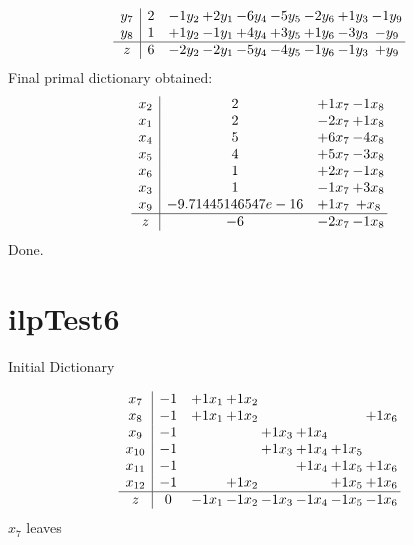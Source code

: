 \documentclass[11pt]{article}
\begin{document}
\[\begin{array}{c| c c@{\hskip 2pt} c@{\hskip 2pt} c@{\hskip 2pt} c@{\hskip 2pt} c@{\hskip 2pt} c@{\hskip 2pt} c@{\hskip 2pt} }
 y_{7}   &  2 & -1 y_{2} & + 2 y_{1} & -6 y_{4} & -5 y_{5} & -2 y_{6} & + 1 y_{3} & -1 y_{9}\\
 y_{8}   &  1 & + 1 y_{2} & -1 y_{1} & + 4 y_{4} & + 3 y_{5} & + 1 y_{6} & -3 y_{3} & - y_{9}\\
\hline
z    &  6 & -2 y_{2} & -2 y_{1} & -5 y_{4} & -4 y_{5} & -1 y_{6} & -1 y_{3} & +  y_{9}\\
\end{array}\]
 Final primal dictionary obtained: 
\[\begin{array}{c| c c@{\hskip 2pt} c@{\hskip 2pt} }
 x_{2}   &  2 & + 1 x_{7} & -1 x_{8}\\
 x_{1}   &  2 & -2 x_{7} & + 1 x_{8}\\
 x_{4}   &  5 & + 6 x_{7} & -4 x_{8}\\
 x_{5}   &  4 & + 5 x_{7} & -3 x_{8}\\
 x_{6}   &  1 & + 2 x_{7} & -1 x_{8}\\
 x_{3}   &  1 & -1 x_{7} & + 3 x_{8}\\
 x_{9}   &  -9.71445146547e-16 & + 1 x_{7} & +  x_{8}\\
\hline
z    &  -6 & -2 x_{7} & -1 x_{8}\\
\end{array}\]
Done.
\section{ilpTest6}

Initial Dictionary 

\[\begin{array}{c| c c@{\hskip 2pt} c@{\hskip 2pt} c@{\hskip 2pt} c@{\hskip 2pt} c@{\hskip 2pt} c@{\hskip 2pt} }
 x_{7}   &  -1 & + 1 x_{1} & + 1 x_{2} &    &    &    &   \\
 x_{8}   &  -1 & + 1 x_{1} & + 1 x_{2} &    &    &   & + 1 x_{6}\\
 x_{9}   &  -1  &    &   & + 1 x_{3} & + 1 x_{4} &    &   \\
 x_{10}   &  -1  &    &   & + 1 x_{3} & + 1 x_{4} & + 1 x_{5} &   \\
 x_{11}   &  -1  &    &    &   & + 1 x_{4} & + 1 x_{5} & + 1 x_{6}\\
 x_{12}   &  -1  &   & + 1 x_{2} &    &   & + 1 x_{5} & + 1 x_{6}\\
\hline
z    &  0 & -1 x_{1} & -1 x_{2} & -1 x_{3} & -1 x_{4} & -1 x_{5} & -1 x_{6}\\
\end{array}\]
$ x_{7} $ leaves 
\end{document}
